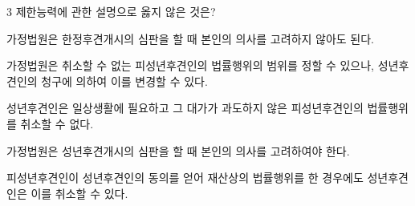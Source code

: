 \begin{question}{3}
제한능력에 관한 설명으로 옳지 않은 것은?
\begin{choices}
  \item 가정법원은 한정후견개시의 심판을 할 때 본인의 의사를 고려하지 않아도 된다.
  \item 가정법원은 취소할 수 없는 피성년후견인의 법률행위의 범위를 정할 수 있으나, 성년후견인의 청구에 의하여 이를 변경할 수 있다.
  \item 성년후견인은 일상생활에 필요하고 그 대가가 과도하지 않은 피성년후견인의 법률행위를 취소할 수 없다.
  \item 가정법원은 성년후견개시의 심판을 할 때 본인의 의사를 고려하여야 한다.
  \item 피성년후견인이 성년후견인의 동의를 얻어 재산상의 법률행위를 한 경우에도 성년후견인은 이를 취소할 수 있다.
\end{choices}
\end{question}
